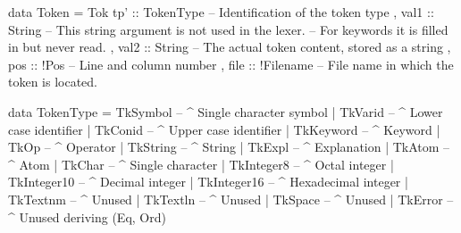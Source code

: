 \begin{haskell}
data Token = Tok
 { tp'  :: TokenType -- Identification of the token type
 , val1 :: String    -- This string argument is not used in the lexer.
                     -- For keywords it is filled in but never read.
 , val2 :: String    -- The actual token content, stored as a string
 , pos  :: !Pos      -- Line and column number
 , file :: !Filename -- File name in which the token is located.
 }

data TokenType
  = TkSymbol    -- ^ Single character symbol
  | TkVarid     -- ^ Lower case identifier
  | TkConid     -- ^ Upper case identifier
  | TkKeyword   -- ^ Keyword
  | TkOp        -- ^ Operator
  | TkString    -- ^ String
  | TkExpl      -- ^ Explanation
  | TkAtom      -- ^ Atom
  | TkChar      -- ^ Single character
  | TkInteger8  -- ^ Octal integer
  | TkInteger10 -- ^ Decimal integer
  | TkInteger16 -- ^ Hexadecimal integer
  | TkTextnm    -- ^ Unused
  | TkTextln    -- ^ Unused
  | TkSpace     -- ^ Unused
  | TkError     -- ^ Unused
  deriving (Eq, Ord)
\end{haskell}
